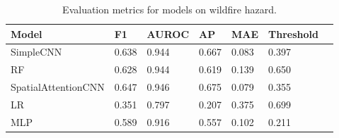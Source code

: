 \begin{table}[h!]
    \centering
    \begin{tabularx}{0.8\textwidth}{@{}lXXXXXX@{}}
    \toprule
    \textbf{Model} & \textbf{F1} & \textbf{AUROC} & \textbf{AP} & \textbf{MAE} & \textbf{Threshold} \\
    \midrule
    SimpleCNN & 0.638 & 0.944 & 0.667 & 0.083 & 0.397 \\
    RF & 0.628 & 0.944 & 0.619 & 0.139 & 0.650 \\
    SpatialAttentionCNN & 0.647 & 0.946 & 0.675 & 0.079 & 0.355 \\
    LR & 0.351 & 0.797 & 0.207 & 0.375 & 0.699 \\
    MLP & 0.589 & 0.916 & 0.557 & 0.102 & 0.211 \\
    \bottomrule
    \end{tabularx}
    \caption{Evaluation metrics for models on wildfire hazard.}
    \label{tab:evaluation_metrics}
\end{table}
